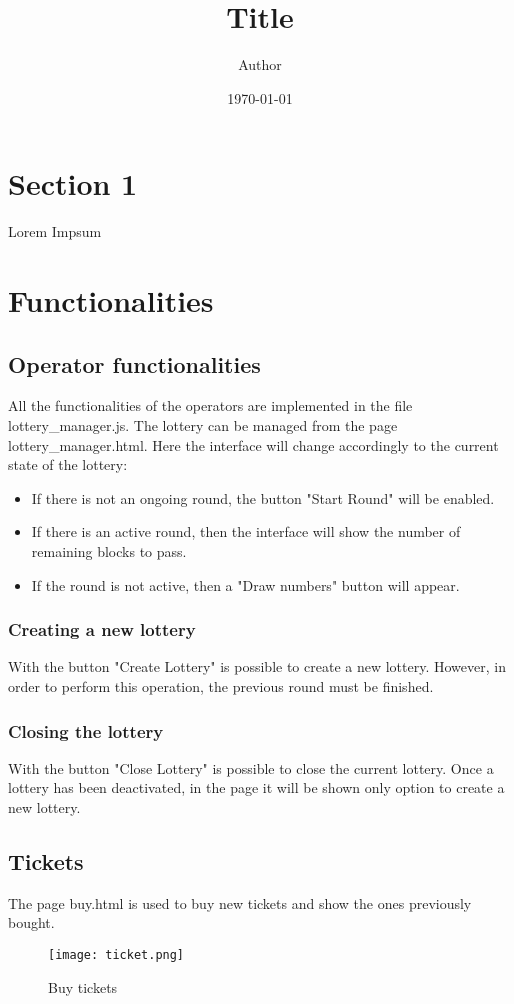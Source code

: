 \documentclass[11pt]{article}
\title{ Title}
\author{ Author }
\date{\today}
\begin{document}
\maketitle	
\pagebreak



\section{Section 1}

Lorem Impsum


\pagebreak
\section{Functionalities}
\subsection{Operator functionalities}
All the functionalities of the operators are implemented in the file lottery\_manager.js.
The lottery can be managed from the page lottery\_manager.html.
Here the interface will change accordingly to the current state of the lottery:
\begin{itemize}

\item If there is not an ongoing round, the button "Start Round" will be enabled.
\item If there is an active round, then the interface will show the number of remaining blocks to pass.
\item If the round is not active, then a "Draw numbers" button will appear.

\end{itemize}
\subsubsection{Creating a new lottery}
With the button "Create Lottery" is possible to create a new lottery. However, in order to perform this operation,
the previous round must be finished.
\subsubsection{Closing the lottery}
With the button "Close Lottery" is possible to close the current lottery. Once a lottery has been deactivated,
in the page it will be shown only option to create a new lottery.
\subsection{Tickets}
The page buy.html is used to buy new tickets and show the ones previously bought.
\begin{figure}[h!]
\centering
\texttt{[image: ticket.png]}
\caption{Buy tickets}
\label{fig:buy}
\end{figure}
\end{document}
